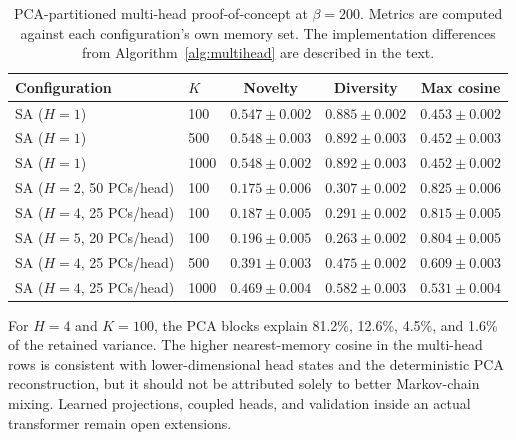 \begin{table}[H]
\centering
\caption{PCA-partitioned multi-head proof-of-concept at $\beta=200$. Metrics
are computed against each configuration's own memory set. The implementation
differences from Algorithm~\ref{alg:multihead} are described in the text.}
\label{tab:multihead}
\small
\begin{tabular}{@{}llccc@{}}
\toprule
Configuration & $K$ & Novelty & Diversity & Max cosine \\
\midrule
SA ($H=1$) & 100  & $0.547\pm0.002$ & $0.885\pm0.002$ & $0.453\pm0.002$ \\
SA ($H=1$) & 500  & $0.548\pm0.003$ & $0.892\pm0.003$ & $0.452\pm0.003$ \\
SA ($H=1$) & 1000 & $0.548\pm0.002$ & $0.892\pm0.003$ & $0.452\pm0.002$ \\
\midrule
SA ($H=2$, 50 PCs/head) & 100 & $0.175\pm0.006$ & $0.307\pm0.002$ & $0.825\pm0.006$ \\
SA ($H=4$, 25 PCs/head) & 100 & $0.187\pm0.005$ & $0.291\pm0.002$ & $0.815\pm0.005$ \\
SA ($H=5$, 20 PCs/head) & 100 & $0.196\pm0.005$ & $0.263\pm0.002$ & $0.804\pm0.005$ \\
\midrule
SA ($H=4$, 25 PCs/head) & 500  & $0.391\pm0.003$ & $0.475\pm0.002$ & $0.609\pm0.003$ \\
SA ($H=4$, 25 PCs/head) & 1000 & $0.469\pm0.004$ & $0.582\pm0.003$ & $0.531\pm0.004$ \\
\bottomrule
\end{tabular}
\end{table}

For $H=4$ and $K=100$, the PCA blocks explain 81.2\%, 12.6\%, 4.5\%, and
1.6\% of the retained variance. The higher nearest-memory cosine in the
multi-head rows is consistent with lower-dimensional head states and the
deterministic PCA reconstruction, but it should not be attributed solely to
better Markov-chain mixing. Learned projections, coupled heads, and validation
inside an actual transformer remain open extensions.

